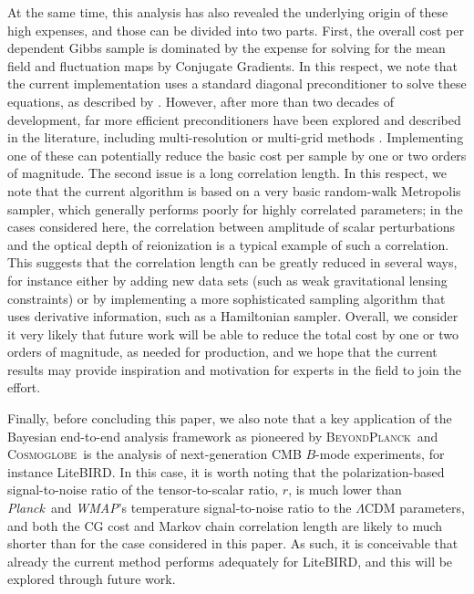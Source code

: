 \documentclass[twocolumn]{../common/aa}
\def\WMAP{\emph{WMAP}}
\def\Planck{\emph{Planck}}
\newcommand{\BP}{\textsc{BeyondPlanck}}
\newcommand{\cosmoglobe}{\textsc{Cosmoglobe}}
\begin{document}
At the same time, this analysis has also revealed the underlying origin of these high expenses, and those can be divided into two parts. First, the overall cost per dependent Gibbs sample is dominated by the expense for solving for the mean field and fluctuation maps by Conjugate Gradients. In this respect, we note that the current implementation uses a standard diagonal preconditioner to solve these equations, as described by \citet{eriksen:2004}. However, after more than two decades of development, far more efficient preconditioners have been explored and described in the literature, including multi-resolution or multi-grid methods \citep[e.g.,][]{seljebotn:2013,seljebotn:2019}. Implementing one of these can potentially reduce the basic cost per sample by one or two orders of magnitude. The second issue is a long correlation length. In this respect, we note that the current algorithm is based on a very basic random-walk Metropolis sampler, which generally performs poorly for highly correlated parameters; in the cases considered here, the correlation between amplitude of scalar perturbations and the optical depth of reionization is a typical example of such a correlation. This suggests that the correlation length can be greatly reduced in several ways, for instance either by adding new data sets (such as weak gravitational lensing constraints) or by implementing a more sophisticated sampling algorithm that uses derivative information, such as a Hamiltonian sampler. Overall, we consider it very likely that future work will be able to reduce the total cost by one or two orders of magnitude, as needed for production, and we hope that the current results may provide inspiration and motivation for experts in the field to join the effort.

Finally, before concluding this paper, we also note that a key application of the Bayesian end-to-end analysis framework as pioneered by \BP\ and \cosmoglobe\ is the analysis of next-generation CMB $B$-mode experiments, for instance LiteBIRD. In this case, it is worth noting that the polarization-based signal-to-noise ratio of the tensor-to-scalar ratio, $r$, is much lower than \Planck\ and \WMAP's temperature signal-to-noise ratio to the $\Lambda$CDM parameters, and both the CG cost and Markov chain correlation length are likely to much shorter than for the case considered in this paper. As such, it is conceivable that already the current method performs adequately for LiteBIRD, and this will be explored through future work.



\end{document}

